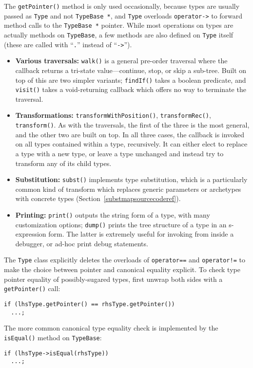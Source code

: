 \documentclass[../generics]{subfiles}
\begin{document}
The \texttt{getPointer()} method is only used occasionally, because types are usually passed as \texttt{Type} and not \texttt{TypeBase *}, and \texttt{Type} overloads \texttt{operator->} to forward method calls to the \texttt{TypeBase *} pointer. While most operations on types are actually methods on \texttt{TypeBase}, a few methods are also defined on \texttt{Type} itself (these are called with ``\texttt{.}'' instead of ``\texttt{->}'').

\begin{itemize}
\item \textbf{Various traversals:} \texttt{walk()} is a general pre-order traversal where the callback returns a tri-state value---continue, stop, or skip a sub-tree. Built on top of this are two simpler variants; \texttt{findIf()} takes a boolean predicate, and \texttt{visit()} takes a void-returning callback which offers no way to terminate the traversal.
\item \textbf{Transformations:} \texttt{transformWithPosition()}, \texttt{transformRec()}, \texttt{transform()}. As with the traversals, the first of the three is the most general, and the other two are built on top. In all three cases, the callback is invoked on all types contained within a type, recursively. It can either elect to replace a type with a new type, or leave a type unchanged and instead try to transform any of its child types.
\item \textbf{Substitution:} \texttt{subst()} implements type substitution, which is a particularly common kind of transform which replaces generic parameters or archetypes with concrete types (Section~\ref{substmapsourcecoderef}).
\item \textbf{Printing:} \texttt{print()} outputs the string form of a type, with many customization options; \texttt{dump()} prints the tree structure of a type in an s-expression form. The latter is extremely useful for invoking from inside a debugger, or ad-hoc print debug statements.
\end{itemize}
The \texttt{Type} class explicitly deletes the overloads of \texttt{operator==} and \texttt{operator!=} to make the choice between pointer and canonical equality explicit. To check type pointer equality of possibly-sugared types, first unwrap both sides with a \texttt{getPointer()} call:
\begin{Verbatim}
if (lhsType.getPointer() == rhsType.getPointer())
  ...;
\end{Verbatim}
The more common canonical type equality check is implemented by the \texttt{isEqual()} method on \texttt{TypeBase}:
\begin{Verbatim}
if (lhsType->isEqual(rhsType))
  ...;
\end{Verbatim}
\end{document}
